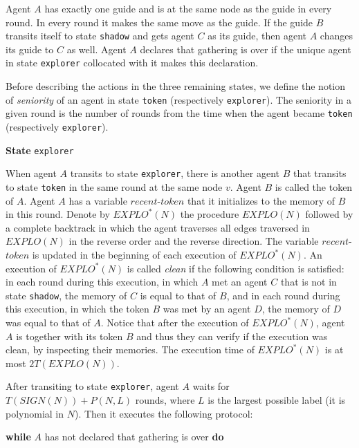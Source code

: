 \documentclass[11pt]{article}
\begin{document}
 Agent $A$ has exactly one guide and is at  the same node as the guide in every round. In every round it makes the same move as the guide.
 If the guide $B$ transits itself to state  {\tt shadow} and gets agent $C$ as its guide, then agent $A$ changes its guide to $C$ as well. 
 Agent $A$ declares that gathering is over if the unique agent in state {\tt explorer} collocated with it makes this declaration.  
 
 Before describing the actions in the three remaining states, we define the notion of {\em seniority} of an agent in state {\tt token} (respectively {\tt explorer}).
The seniority in a given round is the number of rounds from the time when the agent became {\tt token} (respectively {\tt explorer}).

 \vspace*{0.2cm}
 
  \noindent
 {\bf State} {\tt explorer}
 
 When agent $A$ transits to state {\tt explorer}, there is another agent $B$ that transits to state  {\tt token} in the same round at the same node $v$.
 Agent $B$ is called the token of $A$. Agent $A$ has a variable $recent$-$token$ that it initializes to the memory of $B$ in this round. 
 Denote by $EXPLO^*(N)$ the procedure  $EXPLO(N)$ followed by a complete backtrack  in which the agent traverses all edges traversed
in  $EXPLO(N)$ in the reverse order and the reverse direction. The variable $recent$-$token$ is updated in the beginning of each execution of $EXPLO^*(N)$.
 An execution of $EXPLO^*(N)$  is called {\em clean} if 
the following condition is satisfied: in each round  during this execution, in which $A$ met an agent $C$ {that is not in state {\tt shadow}}, the memory of $C$ is equal to that of $B$,
and in each round during this execution, in which the token $B$ was met by an agent $D$, the memory of $D$ was equal to that of $A$. Notice that 
after the execution of  $EXPLO^*(N)$, agent $A$ is together with its token $B$ and thus they can verify if the execution was clean, by inspecting their memories.
The execution time of $EXPLO^*(N)$ is at most $2T(EXPLO(N))$.



 
 
 After transiting to state {\tt explorer}, agent $A$ waits for {$T(SIGN(N))+P(N,L)$ rounds}, where $L$ is the largest possible label (it is 
 polynomial in $N$). 
 Then it executes the following protocol:
\newpage
 
  \vspace*{0.2cm}
  \noindent
 {\bf while} $A$ has not declared that gathering is over {\bf do}
 
\end{document}
